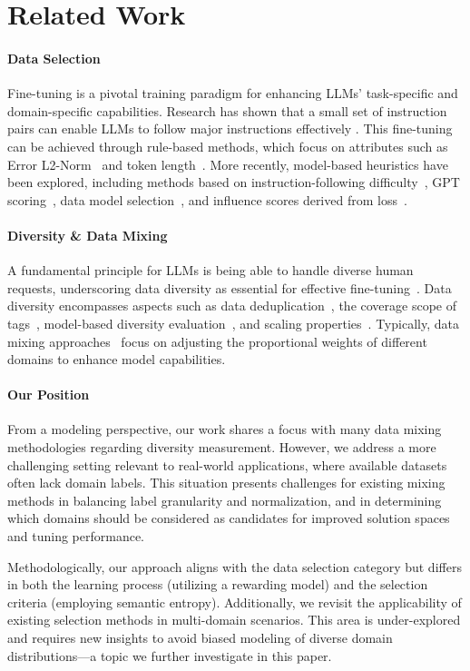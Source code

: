 

\section{Related Work}
\paragraph{Data Selection} Fine-tuning is a pivotal training paradigm for enhancing LLMs' task-specific and domain-specific capabilities. Research has shown that a small set of instruction pairs can enable LLMs to follow major instructions effectively \cite{zhou2024lima,djv1}. This fine-tuning can be achieved through rule-based methods, which focus on attributes such as Error L2-Norm~\cite{paul2021el2n} and token length~\cite{raffel2020exploring}. More recently, model-based heuristics have been explored, including methods based on instruction-following difficulty~\cite{li2024super}, GPT scoring~\cite{chen2024alpagasus, 2024qurating}, data model selection~\cite{2024dsdm}, and influence scores derived from loss~\cite{xialess}.

\paragraph{Diversity \& Data Mixing} A fundamental principle for LLMs is being able to handle diverse human requests, underscoring data diversity as essential for effective fine-tuning~\cite{yu2022can, ding2023enhancing}. Data diversity encompasses aspects such as data deduplication~\cite{abbas2023semdedup}, the coverage scope of tags~\cite{lu2023instag}, model-based diversity evaluation~\cite{liu2023deita, zhang2024harnessing}, and scaling properties~\cite{song2024scaling}. Typically, data mixing approaches~\cite{albalak2023efficient, ye2024data, ge2024bimix} focus on adjusting the proportional weights of different domains to enhance model capabilities.

\paragraph{Our Position} 
From a modeling perspective, our work shares a focus with many data mixing methodologies regarding diversity measurement. However, we address a more challenging setting relevant to real-world applications, where available datasets often lack domain labels. This situation presents challenges for existing mixing methods in balancing label granularity and normalization, and in determining which domains should be considered as candidates for improved solution spaces and tuning performance.

Methodologically, our approach aligns with the data selection category but differs in both the learning process (utilizing a rewarding model) and the selection criteria (employing semantic entropy). Additionally, we revisit the applicability of existing selection methods in multi-domain scenarios. This area is under-explored and requires new insights to avoid biased modeling of diverse domain distributions—a topic we further investigate in this paper.